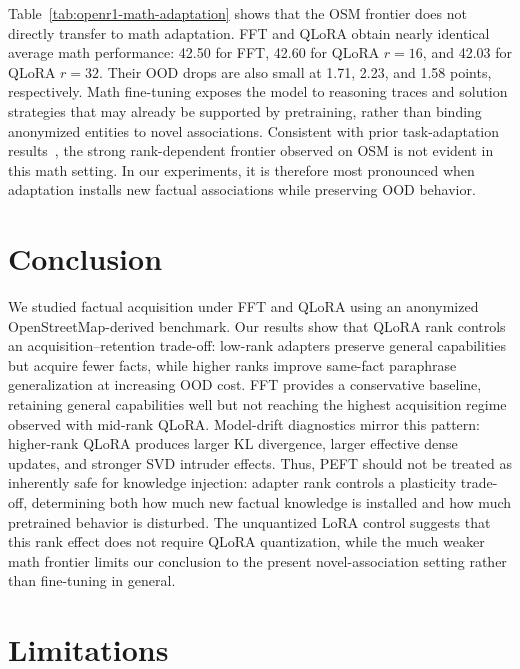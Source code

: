 \documentclass[11pt]{article}
\begin{document}
Table~\ref{tab:openr1-math-adaptation} shows that the OSM frontier does not
directly transfer to math adaptation. FFT and QLoRA obtain nearly identical
average math performance: 42.50 for FFT, 42.60 for QLoRA $r=16$, and 42.03 for
QLoRA $r=32$. Their OOD drops are also small at 1.71, 2.23, and 1.58 points,
respectively. Math fine-tuning exposes the model to reasoning traces and solution
strategies that may already be supported by pretraining, rather than binding
anonymized entities to novel associations. Consistent with prior task-adaptation
results~\citep{biderman2024lora}, the strong rank-dependent frontier observed on
OSM is not evident in this math setting. In our experiments, it is therefore most
pronounced when adaptation installs new factual associations while preserving
OOD behavior.

\section{Conclusion}
\label{sec:conclusion}
We studied factual acquisition under FFT and QLoRA using an anonymized
OpenStreetMap-derived benchmark. Our results show that QLoRA rank controls an
acquisition--retention trade-off: low-rank adapters preserve general
capabilities but acquire fewer facts, while higher ranks improve same-fact
paraphrase generalization at increasing OOD cost. FFT provides a conservative
baseline, retaining general capabilities well but not reaching the highest
acquisition regime observed with mid-rank QLoRA.
Model-drift diagnostics mirror this pattern: higher-rank QLoRA produces larger
KL divergence, larger effective dense updates, and stronger SVD intruder
effects. 
Thus, PEFT should not be treated as inherently safe for knowledge injection:
adapter rank controls a plasticity trade-off, determining both how much new
factual knowledge is installed and how much pretrained behavior is disturbed.
The unquantized LoRA control suggests that this rank effect does not require
QLoRA quantization, while the much weaker math frontier limits our conclusion to
the present novel-association setting rather than fine-tuning in general.


\section*{Limitations}
\end{document}
